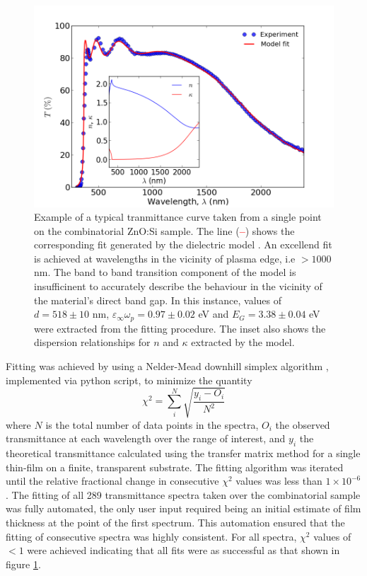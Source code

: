 \documentclass[final,5p,times]{elsarticle}
\begin{document}
\begin{figure}[th!]
\centering
\includegraphics[width = 1.0\columnwidth]{figure1.png}
\caption{\label{fig:1} Example of a typical tranmittance curve taken from a single point on the combinatorial ZnO:Si sample. The line (\textcolor{red}{\textbf{--}}) shows the corresponding fit generated by the dielectric model \cite{Treharne2012}. An excellend fit is achieved at wavelengths in the vicinity of plasma edge, i.e $>1000$ nm. The band to band transition component of the model is insufficinent to accurately describe the behaviour in the vicinity of the material's direct band gap. In this instance, values of $d= 518 \pm 10$ nm, $\varepsilon_{\infty}\omega_p = 0.97 \pm 0.02$ eV and $E_{G} = 3.38 \pm 0.04$ eV were extracted from the fitting procedure. The inset also shows the dispersion relationships for $n$ and $\kappa$ extracted by the model.}
\end{figure}
Fitting was achieved by using a Nelder-Mead downhill simplex algorithm \cite{Nelder1965}, implemented via python script, to minimize the quantity
\begin{equation}
\chi^{2} = \sum_{i}^N\sqrt{\frac{y_i - O_i}{N^2}}
\end{equation}\label{eqn:2}
where $N$ is the total number of data points in the spectra, $O_i$ the observed transmittance at each wavelength over the range of interest, and $y_i$ the theoretical transmittance calculated using the transfer matrix method \cite{Macleod1986} for a single thin-film on a finite, transparent substrate.  The fitting algorithm was iterated until the relative fractional change in consecutive $\chi^2$ values was less than $1\times10^{-6}$. The fitting of all 289 transmittance spectra taken over the combinatorial sample was fully automated, the only user input required being an initial estimate of film thickness at the point of the first spectrum. This automation ensured that the fitting of consecutive spectra was highly consistent. For all spectra, $\chi^2$ values of $<1$ were achieved indicating that all fits were as successful as that shown in figure \ref{fig:1}.
\end{document}
